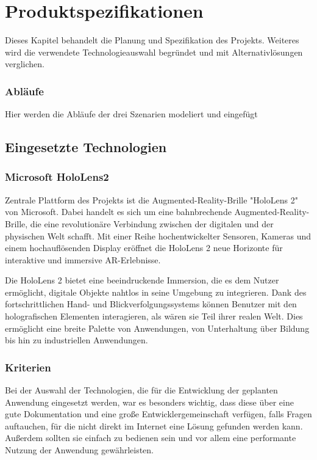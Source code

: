\chapter{Produktspezifikationen}
Dieses Kapitel behandelt die Planung und Spezifikation des Projekts.
Weiteres wird die verwendete Technologieauswahl begründet und mit Alternativlösungen verglichen.



\subsection{Abläufe}
Hier werden die Abläufe der drei Szenarien modeliert und eingefügt


\section{Eingesetzte Technologien}

\subsection{Microsoft HoloLens2}
Zentrale Plattform des Projekts ist die Augmented-Reality-Brille "HoloLens 2" von Microsoft. Dabei handelt es sich um
eine bahnbrechende Augmented-Reality-Brille, die eine revolutionäre Verbindung zwischen der digitalen und der physischen
Welt schafft. Mit einer Reihe hochentwickelter Sensoren, Kameras und einem hochauflösenden Display eröffnet die HoloLens
2 neue Horizonte für interaktive und immersive AR-Erlebnisse.

Die HoloLens 2 bietet eine beeindruckende Immersion, die es dem Nutzer ermöglicht, digitale Objekte nahtlos in seine
Umgebung zu integrieren. Dank des fortschrittlichen Hand- und Blickverfolgungssystems können Benutzer mit den holografischen
Elementen interagieren, als wären sie Teil ihrer realen Welt. Dies ermöglicht eine breite Palette von Anwendungen, von
Unterhaltung über Bildung bis hin zu industriellen Anwendungen.

\subsection{Kriterien}
Bei der Auswahl der Technologien, die für die Entwicklung der geplanten Anwendung eingesetzt werden, war es besonders
wichtig, dass diese über eine gute Dokumentation und eine große Entwicklergemeinschaft verfügen, falls Fragen auftauchen,
für die nicht direkt im Internet eine Lösung gefunden werden kann. Außerdem sollten sie einfach zu bedienen sein und vor
allem eine performante Nutzung der Anwendung gewährleisten.

